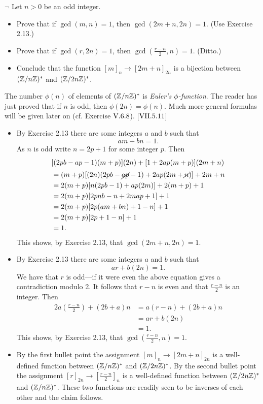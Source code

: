\begin{exercise}
	$\neg$ Let $n > 0$ be an odd integer.
	\begin{itemize}
		\item Prove that if $\gcd(m,n) = 1$, then $\gcd(2m+n, 2n) = 1$. (Use Exercise 2.13.)
		\item Prove that if $\gcd(r,2n) = 1$, then $\gcd(\frac{r-n}{2}, n ) = 1$. (Ditto.)
		\item Conclude that the function $[m]_n \to [2m + n]_{2n}$ is a bijection between $(\mathbb{Z}/n\mathbb{Z})^*$ and $(\mathbb{Z}/2n\mathbb{Z})^*$.
	\end{itemize}
	The number $\phi(n)$ of elements of $(\mathbb{Z}/n\mathbb{Z})^*$ is \emph{Euler's $\phi$-function}. The reader has just proved that if $n$ is odd, then $\phi(2n) = \phi(n)$. Much more general formulas will be given later on (cf. Exercise $\RNo{5}.6.8$). [$\RNo{7}.5.11$]
\end{exercise}
\begin{solution}\leavevmode
	\begin{itemize}
		\item By Exercise 2.13 there are some integers $a$ and $b$ such that
		\[
			am + bn = 1.
		\]
		As $n$ is odd write $n = 2p + 1$ for some integer $p$. Then
		\begin{align*}
			\intertext{\centering$[(2pb - ap-1)(m+p)](2n) + [1 + 2ap(m+p)](2m + n)$}%
			&= (m+p)[(2n)(2pb - \cancel{ap} -1) + 2ap(2m+\cancel{n})] + 2m + n\\
			&= 2(m+p)[n(2pb - 1) + ap(2m)] + 2(m+p) + 1\\
			&= 2(m+p)[2pnb - n + 2map + 1] + 1\\
			&= 2(m+p)[2p(am + bn) +1 -n ] + 1\\
			&= 2(m+p)[2p + 1 -n] +1\\
			&= 1.
		\end{align*}
		This shows, by Exercise 2.13, that $\gcd(2m + n, 2n) = 1$. 
		\item By Exercise 2.13 there are some integers $a$ and $b$ such that
		\[
			ar + b(2n) = 1.
		\]
		We have that $r$ is odd---if it were even the above equation gives a contradiction modulo 2. It follows that $r-n$ is even and that $\frac{r-n}{2}$ is an integer. Then
		\begin{align*}
			2a\left(\frac{r-n}{2}\right)  + (2b+a)n	&= a(r-n) + (2b + a)n\\
			&= ar + b(2n) \\
			&=1.
		\end{align*}
		This shows, by Exercise 2.13, that $\gcd\left(\frac{r-n}{2}, n\right) = 1$. 
		\item By the first bullet point the assignment $[m]_n \to [2m + n]_{2n}$ is a well-defined function between $(\mathbb{Z}/n\mathbb{Z})^*$ and $(\mathbb{Z}/2n\mathbb{Z})^*$. By the second bullet point the assignment $[r]_{2n} \to \left[\frac{r-n}{2}\right]_n$ is a well-defined function between $(\mathbb{Z}/2n\mathbb{Z})^*$ and $(\mathbb{Z}/n\mathbb{Z})^*$. These two functions are readily seen to be inverses of each other and the claim follows.
	\end{itemize}
\end{solution}

